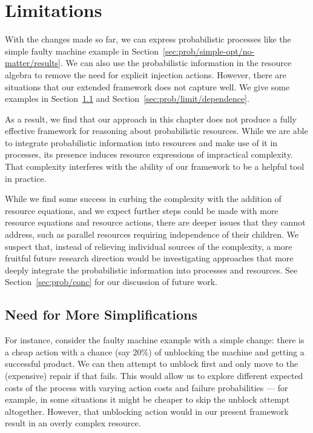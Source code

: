 \documentclass[class=smolathesis,crop=false]{standalone}
\begin{document}
\section{Limitations}
\label{sec:prob/limit}

With the changes made so far, we can express probabilistic processes like the simple faulty machine example in Section~\ref{sec:prob/simple-opt/no-matter/results}.
We can also use the probabilistic information in the resource algebra to remove the need for explicit injection actions.
However, there are situations that our extended framework does not capture well.
We give some examples in Section~\ref{sec:prob/limit/more-simps} and Section~\ref{sec:prob/limit/dependence}.

As a result, we find that our approach in this chapter does not produce a fully effective framework for reasoning about probabilistic resources.
While we are able to integrate probabilistic information into resources and make use of it in processes, its presence induces resource expressions of impractical complexity.
That complexity interferes with the ability of our framework to be a helpful tool in practice.

While we find some success in curbing the complexity with the addition of resource equations, and we expect further steps could be made with more resource equations and resource actions, there are deeper issues that they cannot address, such as parallel resources requiring independence of their children.
We suspect that, instead of relieving individual sources of the complexity, a more fruitful future research direction would be investigating approaches that more deeply integrate the probabilistic information into processes and resources.
See Section~\ref{sec:prob/conc} for our discussion of future work.

\subsection{Need for More Simplifications}
\label{sec:prob/limit/more-simps}

For instance, consider the faulty machine example with a simple change: there is a cheap action with a chance (say 20\%) of unblocking the machine and getting a successful product.
We can then attempt to unblock first and only move to the (expensive) repair if that fails.
This would allow us to explore different expected costs of the process with varying action costs and failure probabilities --- for example, in some situations it might be cheaper to skip the unblock attempt altogether.
However, that unblocking action would in our present framework result in an overly complex resource.
\end{document}
